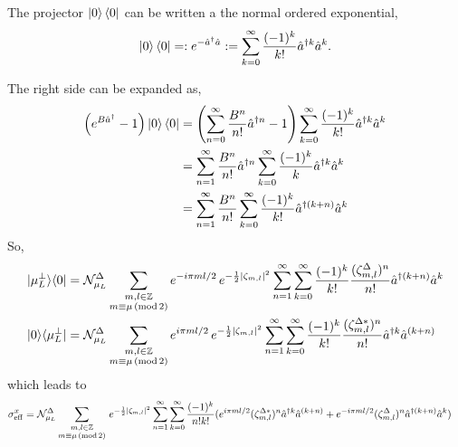 \documentclass[11pt]{article}
\begin{document}
The projector $\ket{0}\bra{0}$ can be written a the normal ordered exponential,
$$\ket{0}\bra{0} = : e^{-\hat{a}^\dagger \hat{a}} : = \sum_{k=0}^{\infty} \frac{(-1)^k}{k!} \hat{a}^{\dagger k} \hat{a}^{k}.$$

The right side can be expanded as,
\begin{align*}
    \left(e^{B \hat{a}^\dagger} - 1\right) \ket{0}\bra{0} & = \left(\sum_{n=0}^{\infty} \frac{B^n}{n!} \hat{a}^{\dagger n} - 1\right) \sum_{k=0}^{\infty} \frac{(-1)^k}{k!} \hat{a}^{\dagger k} \hat{a}^{k} \\
                                                          & = \sum_{n=1}^{\infty} \frac{B^n}{n!} \hat{a}^{\dagger n} \sum_{k=0}^{\infty} \frac{(-1)^k}{k} \hat{a}^{\dagger k} \hat{a}^{k}                   \\
                                                          & = \sum_{n=1}^{\infty} \frac{B^n}{n!} \sum_{k=0}^{\infty} \frac{(-1)^k}{k!}  \hat{a}^{\dagger (k + n)} \hat{a}^{k}
\end{align*}
So,
\begin{align*}
    |\mu_L^{\perp}\rangle \langle 0|  & = \mathcal{N}_{\mu_L}^{\Delta} \sum_{\substack{m, l \in \mathbb{Z} \\ m \equiv \mu \,(\mathrm{mod}\, 2)}} e^{-i \pi m l / 2} \, e^{-\frac{1}{2} \abs{\zeta_{m,l}}^2} \sum_{n=1}^{\infty} \sum_{k=0}^{\infty} \frac{(-1)^k}{k!} \frac{(\zeta_{m,l}^\Delta)^n}{n!} \hat{a}^{\dagger (k + n)} \hat{a}^{k} \\
    |0 \rangle \langle \mu_L^{\perp}| & = \mathcal{N}_{\mu_L}^{\Delta} \sum_{\substack{m, l \in \mathbb{Z} \\ m \equiv \mu \,(\mathrm{mod}\, 2)}} e^{i \pi m l / 2} \, e^{-\frac{1}{2} \abs{\zeta_{m,l}}^2} \sum_{n=1}^{\infty} \sum_{k=0}^{\infty} \frac{(-1)^k}{k!} \frac{(\zeta_{m,l}^{\Delta *})^n}{n!} \hat{a}^{\dagger k} \hat{a}^{(k + n)} \\
\end{align*}
which leads to
\begin{align}
    \sigma_{\mathrm{eff}}^{x} & = \mathcal{N}_{\mu_L}^{\Delta} \sum_{\substack{m, l \in \mathbb{Z} \\ m \equiv \mu \,(\mathrm{mod}\, 2)}} \, e^{-\frac{1}{2} \abs{\zeta_{m,l}}^2} \sum_{n=1}^{\infty} \sum_{k=0}^{\infty} \frac{(-1)^k}{n!k!} (e^{i \pi m l / 2} (\zeta_{m,l}^{\Delta *})^n \hat{a}^{\dagger k} \hat{a}^{(k + n)} + e^{-i \pi m l / 2} (\zeta_{m,l}^{\Delta})^n\hat{a}^{\dagger (k + n)} \hat{a}^{k})
\end{align}



\newpage
\printbibliography
\end{document}
